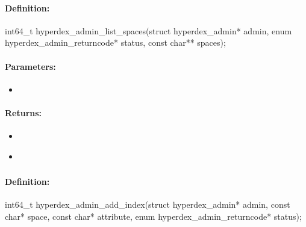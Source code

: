 \paragraph{Definition:}
\begin{ccode}
int64_t hyperdex_admin_list_spaces(struct hyperdex_admin* admin,
        enum hyperdex_admin_returncode* status,
        const char** spaces);
\end{ccode}

\paragraph{Parameters:}
\begin{itemize}[noitemsep]
\item {}\\

\end{itemize}

\paragraph{Returns:}
\begin{itemize}[noitemsep]
\item {}\\

\item {}\\

\end{itemize}

\pagebreak
\subsubsection{}
\label{api:c:add_index}


\paragraph{Definition:}
\begin{ccode}
int64_t hyperdex_admin_add_index(struct hyperdex_admin* admin,
        const char* space,
        const char* attribute,
        enum hyperdex_admin_returncode* status);
\end{ccode}

